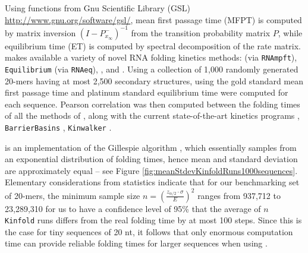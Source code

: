 Using functions from Gnu Scientific Library (GSL)
\url{http://www.gnu.org/software/gsl/}, mean first passage time
(MFPT) is computed by matrix inversion
$(I - P^{-}_{x_{\infty}})^{-1}$ from the transition probability matrix
$P$, while equilibrium time (ET) is computed by spectral
decomposition of the rate matrix. \hermes makes available a
variety of novel RNA folding kinetics methods: \rnamfpt (via {\tt RNAmpft}), {\tt
Equilibrium} (via {\tt RNAeq}), \fftmfpt, and \ffteq.
Using a collection of 1,000 randomly generated 20-mers having at most
2,500 secondary structures, using \hermes the gold standard
mean first passage time and platinum standard equilibrium time were
computed for each sequence.
Pearson correlation was then computed
between the folding times of all the methods of \hermes, along
with the current state-of-the-art kinetics programs \kinfold
\citep{flamm}, {\tt BarrierBasins} \citep{wolfingerStadler:kinetics},
{\tt Kinwalker} \citep{Geis.jmb08}.

\kinfold is an implementation
of the Gillespie algorithm \citep{gillespieStochasticSimulation1},
which essentially samples from an exponential distribution of folding
times, hence \kinfold mean and standard deviation are
approximately equal -- see
Figure \ref{fig:meanStdevKinfoldRuns1000sequences}. Elementary
considerations from statistics indicate that for our benchmarking set
of 20-mers, the minimum sample size $n = \left( \frac{z_{\alpha/2}
\cdot \sigma}{E} \right)^2$ ranges from 937,712 to 23,289,310 for us
to have a confidence level of 95\% that the average of $n$ {\tt
Kinfold} runs differs from the real folding time by at most 100 steps.
Since this is the case for tiny sequences of 20 nt, it follows that
only enormous computation time can provide reliable folding times for
larger sequences when using \kinfold.

